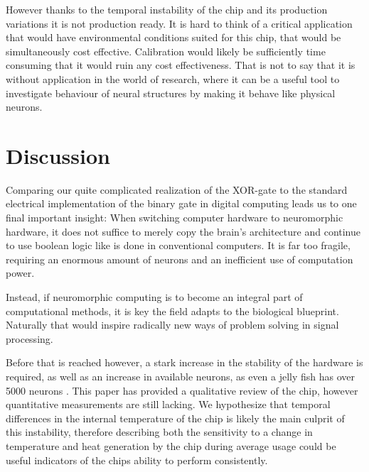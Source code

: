 \documentclass[10pt,a4paper]{article}
\begin{document}
However thanks to the temporal instability of the chip and its production
variations it is not production ready. It is hard to think of a critical
application that would have environmental conditions suited for this chip, that
would be simultaneously cost effective. Calibration would likely be sufficiently
time consuming that it would ruin any cost effectiveness. That is not to say
that it is without application in the world of research, where it can be a
useful tool to investigate behaviour of neural structures by making it behave
like physical neurons.

\section{Discussion}
Comparing our quite complicated realization of the XOR-gate to the standard
electrical implementation of the binary gate in digital computing leads us to
one final important insight: When switching computer hardware to neuromorphic
hardware, it does not suffice to merely copy the brain's architecture and
continue to use boolean logic like is done in conventional computers. It is far
too fragile, requiring an enormous amount of neurons and an inefficient use of
computation power.

Instead, if neuromorphic computing is to become an integral part of
computational methods, it is key the field adapts to the biological blueprint.
Naturally that would inspire radically new ways of problem solving in signal
processing.

Before that is reached however, a stark increase in the stability of the
hardware is required, as well as an increase in available neurons, as even a
jelly fish has over 5000 neurons \cite{neuronsjellyfish}. This paper has
provided a qualitative review of the chip, however quantitative measurements are
still lacking. We hypothesize that temporal differences in the internal
temperature of the chip is likely the main culprit of this instability,
therefore describing both the sensitivity to a change in temperature and heat
generation by the chip during average usage could be useful indicators of the
chips ability to perform consistently.
\end{document}
